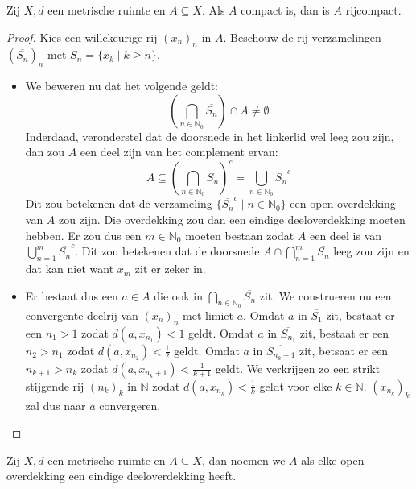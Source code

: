 \documentclass[main.tex]{subfiles}
\begin{document}
\begin{bst}
  \label{st:compact-dan-rijcompact}
  Zij $X,d$ een metrische ruimte en $A \subseteq X$.
  Als $A$ compact is, dan is $A$ rijcompact.

  \begin{proof}
    Kies een willekeurige rij $(x_{n})_{n}$ in $A$.
    Beschouw de rij verzamelingen $(\overline{S_{n}})_{n}$ met $S_{n} = \{x_{k}\mid k \ge n\}$.
    \begin{itemize}
    \item 
      We beweren nu dat het volgende geldt:
      \[ \left( \bigcap_{n\in \mathbb{N}_{0}}\overline{S_{n}} \right) \cap A \neq \emptyset \]
      Inderdaad, veronderstel dat de doorsnede in het linkerlid wel leeg zou zijn, dan zou $A$ een deel zijn van het complement ervan:
      \[ A \subseteq \left( \bigcap_{n\in\mathbb{N}_{0}}\overline{S_{n}}\right)^{c} = \bigcup_{n\in\mathbb{N}_{0}}\overline{S_{n}}^{c} \]
      Dit zou betekenen dat de verzameling $\{ \overline{S_{n}}^{c} \mid n \in \mathbb{N}_{0} \}$ een open overdekking van $A$ zou zijn.
      Die overdekking zou dan een eindige deeloverdekking moeten hebben.
      Er zou dus een $m\in \mathbb{N}_{0}$ moeten bestaan zodat $A$ een deel is van $\bigcup_{n=1}^{m}\overline{S_{n}}^{c}$.
      Dit zou betekenen dat de doorsnede $A \cap \bigcap_{n=1}^{m}\overline{S_{n}}$ leeg zou zijn en dat kan niet want $x_{m}$ zit er zeker in.\waarom
    \item 
      Er bestaat dus een $a\in A$ die ook in $\bigcap_{n\in\mathbb{N}_{0}}\overline{S_{n}}$ zit.
      We construeren nu een convergente deelrij van $(x_{n})_{n}$ met limiet $a$.
      Omdat $a$ in $\overline{S_{1}}$ zit, bestaat er een $n_{1} > 1$ zodat $d(a,x_{n_{1}}) < 1$ geldt.\waarom
      Omdat $a$ in $\overline{S_{n_{1}}}$ zit, bestaat er een $n_{2} > n_{1}$ zodat $d(a,x_{n_{2}}) < \frac{1}{2}$ geldt.
      Omdat $a$ in $\overline{S_{n_{k}+1}}$ zit, betsaat er een $n_{k+1} > n_{k}$ zodat $d(a,x_{n_{k}+1}) < \frac{1}{k+1}$ geldt.
      We verkrijgen zo een strikt stijgende rij $(n_{k})_{k}$ in $\mathbb{N}$ zodat $d(a,x_{n_{k}}) < \frac{1}{k}$ geldt voor elke $k\in \mathbb{N}$.
      $(x_{n_{k}})_{k}$ zal dus naar $a$ convergeren.
    \end{itemize}
  \end{proof}
\end{bst}



\begin{de}
  Zij $X,d$ een metrische ruimte en $A \subseteq X$, dan noemen we $A$  als elke open overdekking een eindige deeloverdekking heeft.
\end{de}
\end{document}
